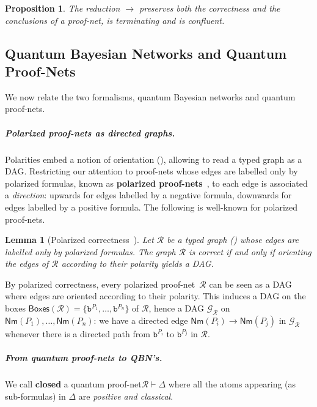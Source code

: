 \documentclass[10pt,a4paper]{article}
\newcommand{\textdef}[1]{\textbf{#1}}
\newcommand*{\definitive}[1]{\textbf{#1}}
\newcommand{\der}{\vdash}
\newcommand{\Nm}[1]{\mathsf{Nm}(#1)}
\newcommand*{\boxof}[1]{\ensuremath{\bbox^{#1}}}
\newcommand*{\somepn}{\mathcal{R}}
\newcommand*{\G}{\mathcal{G}}
\newcommand{\netR}{\mathcal R}
\newcommand{\R}{\netR}
\newcommand{\bbox}{\mathtt{b}}
\newcommand{\Boxes}[1]{\mathsf{Boxes}(#1)}
\newcommand{\Red}[1][]{\xrightarrow{#1}}
\newcommand*{\qCPT}{Q-\textsf{cpt}\xspace}
\newcommand*{\qqbn}{\textsf{QBN}}
\newcommand*{\qpn}{quantum proof-net\xspace}
\newcommand*{\qpns}{quantum proof-nets\xspace}
\newcommand*{\qbpn}{\textsf{qpn}\xspace}
\newcommand*{\good}{closed\xspace}
\newcommand{\pn}{proof-net\xspace}
\newtheorem{lemma}[theorem]{Lemma}
\newtheorem{proposition}[theorem]{Proposition}
\begin{document}
\begin{proposition}
The reduction $\Red$ preserves both the correctness and the conclusions of a proof-net, is terminating and is confluent.
\end{proposition}


\subsection{Quantum Bayesian Networks and Quantum Proof-Nets}\label{sec:QBN_qpn}

We now relate the two formalisms, quantum Bayesian networks and quantum proof-nets.

\subparagraph{Polarized proof-nets as directed graphs.}

Polarities embed a notion of orientation (), allowing to read a typed graph as a DAG.
Restricting our attention to proof-nets whose edges are labelled only by polarized formulas, known as \textdef{polarized proof-nets}~\cite{Laurent03}, to each edge is associated a \emph{direction}: upwards for edges labelled by a negative formula, downwards for edges labelled by a positive formula.
The following is well-known for polarized proof-nets.

\begin{lemma}[Polarized correctness~\cite{phdlaurent}]\label{lem:pol_correct}
Let $\somepn$ be a typed graph () whose edges are labelled only by polarized formulas. 
The graph $\somepn$ is \emph{correct} if and only if orienting the edges of $\somepn$ according to their polarity yields a DAG.
\end{lemma}

By polarized correctness, every polarized \pn\ $\somepn$ can be seen as a DAG where edges are oriented according to their polarity. 
This induces a DAG on the boxes $\Boxes\somepn=\{\boxof{P_1}, \dots, \boxof{P_n}\}$ of $\somepn$, hence a DAG $\G_\somepn$ on $\Nm{P_1}, \dots, \Nm{P_n}$: we have a directed edge $\Nm{P_i} \rightarrow \Nm{P_j}$ in $\G_\somepn$ whenever there is a directed path from $\bbox^{P_i}$ to $\bbox^{P_j}$ in $\somepn$.

\subparagraph{From \qpns to \qqbn's.}

We call \definitive{\good} a \qpn $\somepn \der \Delta$ where all the atoms appearing (as sub-formulas) in $\Delta$ are \emph{positive and classical}.
\end{document}

